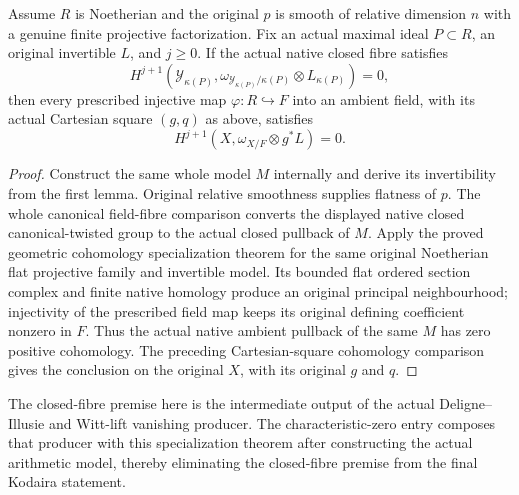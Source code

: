 \begin{theorem}
\label{thm:kn-arithmetic-canonical-specialization}
\leanok
{}
Assume $R$ is Noetherian and the original $p$ is smooth of relative dimension
$n$ with a genuine finite projective factorization.  Fix an actual maximal
ideal $P\subset R$, an original invertible $L$, and $j\geq0$.  If the actual
native closed fibre satisfies
\[
 H^{j+1}(\mathcal Y_{\kappa(P)},
   \omega_{\mathcal Y_{\kappa(P)}/\kappa(P)}\otimes L_{\kappa(P)})=0,
\]
then every prescribed injective map $\varphi:R\hookrightarrow F$ into an
ambient field, with its actual Cartesian square $(g,q)$ as above, satisfies
\[
  H^{j+1}(X,\omega_{X/F}\otimes g^*L)=0.
\]
\end{theorem}
\begin{proof}
Construct the same whole model $M$ internally and derive its invertibility
from the first lemma.  Original relative smoothness supplies flatness of
$p$.  The whole canonical field-fibre comparison converts the displayed
native closed canonical-twisted group to the actual closed pullback of $M$.
Apply the proved geometric cohomology specialization theorem for the same
original Noetherian flat projective family and invertible model.  Its
bounded flat ordered section complex and finite native homology produce an
original principal neighbourhood; injectivity of the prescribed field map
keeps its original defining coefficient nonzero in $F$.  Thus the actual
native ambient pullback of the same $M$ has zero positive cohomology.
The preceding Cartesian-square cohomology comparison gives the conclusion
on the original $X$, with its original $g$ and $q$.
\end{proof}

The closed-fibre premise here is the intermediate output of the actual
Deligne--Illusie and Witt-lift vanishing producer.  The characteristic-zero
entry composes that producer with this specialization theorem after
constructing the actual arithmetic model, thereby eliminating the
closed-fibre premise from the final Kodaira statement.

